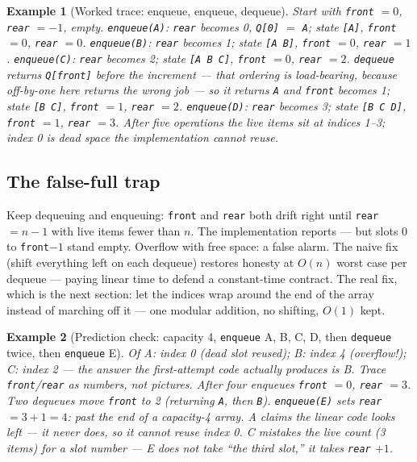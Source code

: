\documentclass[11pt]{article}
\newtheorem{example}{Example}[section]
\begin{document}
\begin{example}[Worked trace: enqueue, enqueue, dequeue]
Start with \texttt{front} $= 0$, \texttt{rear} $= -1$, empty. \texttt{enqueue(A)}: \texttt{rear} becomes 0, \texttt{Q[0]} $=$ \texttt{A}; state \texttt{[A]}, \texttt{front} $= 0$, \texttt{rear} $= 0$. \texttt{enqueue(B)}: \texttt{rear} becomes 1; state \texttt{[A B]}, \texttt{front} $= 0$, \texttt{rear} $= 1$. \texttt{enqueue(C)}: \texttt{rear} becomes 2; state \texttt{[A B C]}, \texttt{front} $= 0$, \texttt{rear} $= 2$. \texttt{dequeue} returns \texttt{Q[front]} \emph{before} the increment --- that ordering is load-bearing, because off-by-one here returns the wrong job --- so it returns \texttt{A} and \texttt{front} becomes 1; state \texttt{[B C]}, \texttt{front} $= 1$, \texttt{rear} $= 2$. \texttt{enqueue(D)}: \texttt{rear} becomes 3; state \texttt{[B C D]}, \texttt{front} $= 1$, \texttt{rear} $= 3$. After five operations the live items sit at indices 1--3; index 0 is dead space the implementation cannot reuse.
\end{example}

\subsection{The false-full trap}

Keep dequeuing and enqueuing: \texttt{front} and \texttt{rear} both drift right until \texttt{rear} $= n - 1$ with live items fewer than $n$. The implementation reports  --- but slots $0$ to \texttt{front}$-1$ stand empty. Overflow with free space: a false alarm. The naive fix (shift everything left on each dequeue) restores honesty at $O(n)$ worst case per dequeue --- paying linear time to defend a constant-time contract. The real fix, which is the next section: let the indices wrap around the end of the array instead of marching off it --- one modular addition, no shifting, $O(1)$ kept.

\begin{example}[Prediction check: capacity 4, \texttt{enqueue} A, B, C, D, then \texttt{dequeue} twice, then \texttt{enqueue} E]
Of A: index 0 (dead slot reused); B: index 4 (overflow!); C: index 2 --- the answer the first-attempt code actually produces is B. Trace \texttt{front}/\texttt{rear} as numbers, not pictures. After four enqueues \texttt{front} $= 0$, \texttt{rear} $= 3$. Two dequeues move \texttt{front} to 2 (returning \texttt{A}, then \texttt{B}). \texttt{enqueue(E)} sets \texttt{rear} $= 3 + 1 = 4$: past the end of a capacity-4 array. A claims the linear code looks left --- it never does, so it cannot reuse index 0. C mistakes the live count (3 items) for a slot number --- E does not take ``the third slot,'' it takes \texttt{rear} $+ 1$.
\end{example}
\end{document}
